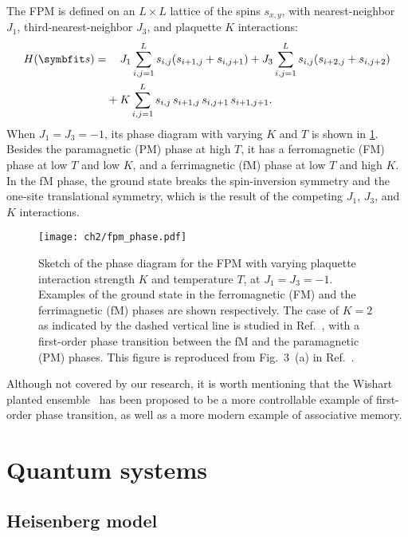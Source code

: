 The FPM is defined on an $L \times L$ lattice of the spins $s_{x, y}$, with nearest-neighbor $J_1$, third-nearest-neighbor $J_3$, and plaquette $K$ interactions:
\begin{align}
H(\vs) = &\phantom{{}+{}} J_1 \sum_{i, j = 1}^L s_{i, j} (s_{i + 1, j} + s_{i, j + 1})
+ J_3 \sum_{i, j = 1}^L s_{i, j} (s_{i + 2, j} + s_{i, j + 2}) \nonumber \\
&+ K \sum_{i, j = 1}^L s_{i, j} \, s_{i + 1, j} \, s_{i, j + 1} \, s_{i + 1, j + 1}.
\label{eq:fpm}
\end{align}
When $J_1 = J_3 = -1$, its phase diagram with varying $K$ and $T$ is shown in \cref{fig:fpm-phase}. Besides the paramagnetic (PM) phase at high $T$, it has a ferromagnetic (FM) phase at low $T$ and low $K$, and a ferrimagnetic (fM) phase at low $T$ and high $K$. In the fM phase, the ground state breaks the spin-inversion symmetry and the one-site translational symmetry, which is the result of the competing $J_1$, $J_3$, and $K$ interactions.

\begin{figure}[htb]
\centering
\texttt{[image: ch2/fpm\_phase.pdf]}
\caption[Phase diagram of frustrated plaquette model (FPM)]{
Sketch of the phase diagram for the FPM with varying plaquette interaction strength $K$ and temperature $T$, at $J_1 = J_3 = -1$.
Examples of the ground state in the ferromagnetic (FM) and the ferrimagnetic (fM) phases are shown respectively.
The case of $K = 2$ as indicated by the dashed vertical line is studied in Ref.~\cite{wu2021unbiased}, with a first-order phase transition between the fM and the paramagnetic (PM) phases.
This figure is reproduced from Fig.~3~(a) in Ref.~\cite{wu2021unbiased}.
}
\label{fig:fpm-phase}
\end{figure}

Although not covered by our research, it is worth mentioning that the Wishart planted ensemble~\cite{hamze2020wishart, hibat2021variational} has been proposed to be a more controllable example of first-order phase transition, as well as a more modern example of associative memory.

\section{Quantum systems}
\label{sec:qu-sys}

\subsection{Heisenberg model}

